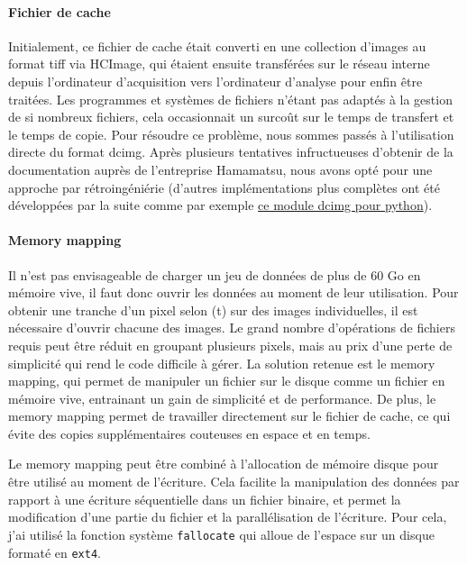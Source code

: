 \paragraph{Fichier de cache}
Initialement, ce fichier de cache était converti en une collection d'images au format tiff via HCImage, qui étaient ensuite transférées sur le réseau interne depuis l'ordinateur d'acquisition vers l'ordinateur d'analyse pour enfin être traitées. Les programmes et systèmes de fichiers n'étant pas adaptés à la gestion de si nombreux fichiers, cela occasionnait un surcoût sur le temps de transfert et le temps de copie. Pour résoudre ce problème, nous sommes passés à l'utilisation directe du format dcimg. Après plusieurs tentatives infructueuses d'obtenir de la documentation auprès de l'entreprise Hamamatsu, nous avons opté pour une approche par rétroingéniérie (d'autres implémentations plus complètes ont été développées par la suite comme par exemple \href{https://github.com/lens-biophotonics/dcimg}{ce module dcimg pour python}).

\paragraph{Memory mapping}
Il n'est pas envisageable de charger un jeu de données de plus de 60 Go en mémoire vive, il faut donc ouvrir les données au moment de leur utilisation. Pour obtenir une tranche d'un pixel selon (t) sur des images individuelles, il est nécessaire d'ouvrir chacune des images. Le grand nombre d'opérations de fichiers requis peut être réduit en groupant plusieurs pixels, mais au prix d'une perte de simplicité qui rend le code difficile à gérer. La solution retenue est le memory mapping, qui permet de manipuler un fichier sur le disque comme un fichier en mémoire vive, entrainant un gain de simplicité et de performance. De plus, le memory mapping permet de travailler directement sur le fichier de cache, ce qui évite des copies supplémentaires couteuses en espace et en temps.

Le memory mapping peut être combiné à l'allocation de mémoire disque pour être utilisé au moment de l'écriture. Cela facilite la manipulation des données par rapport à une écriture séquentielle dans un fichier binaire, et permet la modification d'une partie du fichier et la parallélisation de l'écriture. Pour cela, j'ai utilisé la fonction système \verb|fallocate| qui alloue de l'espace sur un disque formaté en \verb|ext4|.

